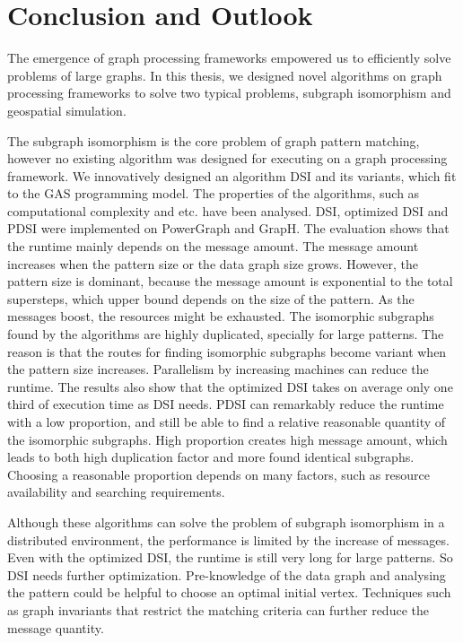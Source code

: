 \chapter{Conclusion and Outlook}\label{chap:c6}

The emergence of graph processing frameworks empowered us to efficiently solve problems of large graphs. In this thesis, we designed novel algorithms on graph processing frameworks to solve two typical problems, subgraph isomorphism and geospatial simulation. 

The subgraph isomorphism is the core problem of graph pattern matching, however no existing algorithm was designed for executing on a graph processing framework. We innovatively designed an algorithm DSI and its variants, which fit to the GAS programming model. The properties of the algorithms, such as computational complexity and etc. have been analysed. DSI, optimized DSI and PDSI were implemented on PowerGraph and GrapH. The evaluation shows that the runtime mainly depends on the message amount. The message amount increases when the pattern size or the data graph size grows. However, the pattern size is dominant, because the message amount is exponential to the total supersteps, which upper bound depends on the size of the pattern. As the messages boost, the resources might be exhausted. The isomorphic subgraphs found by the algorithms are highly duplicated, specially for large patterns. The reason is that the routes for finding isomorphic subgraphs become variant when the pattern size increases. Parallelism by increasing machines can reduce the runtime. The results also show that the optimized DSI takes on average only one third of execution time as DSI needs. PDSI can remarkably reduce the runtime with a low proportion, and still be able to find a relative reasonable quantity of the isomorphic subgraphs. High proportion creates high message amount, which leads to both high duplication factor and more found identical subgraphs. Choosing a reasonable proportion depends on many factors, such as resource availability and searching requirements.

Although these algorithms can solve the problem of subgraph isomorphism in a distributed environment, the performance is limited by the increase of messages. Even with the optimized DSI, the runtime is still very long for large patterns. So DSI needs further optimization. Pre-knowledge of the data graph and analysing the pattern could be helpful to choose an optimal initial vertex. Techniques such as graph invariants that restrict the matching criteria can further reduce the message quantity.

